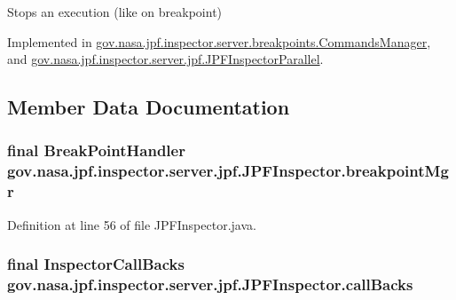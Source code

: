 Stops an execution (like on breakpoint) 



Implemented in \hyperlink{classgov_1_1nasa_1_1jpf_1_1inspector_1_1server_1_1breakpoints_1_1_commands_manager_ad3de2e0a6d30af40d0167bb7ec11f305}{gov.\+nasa.\+jpf.\+inspector.\+server.\+breakpoints.\+Commands\+Manager}, and \hyperlink{classgov_1_1nasa_1_1jpf_1_1inspector_1_1server_1_1jpf_1_1_j_p_f_inspector_parallel_a463604600d1f706e87ace1aeb2c4ef39}{gov.\+nasa.\+jpf.\+inspector.\+server.\+jpf.\+J\+P\+F\+Inspector\+Parallel}.



\subsection{Member Data Documentation}
\subsubsection[{\texorpdfstring{breakpoint\+Mgr}{breakpointMgr}}]{\setlength{\rightskip}{0pt plus 5cm}final {\bf Break\+Point\+Handler} gov.\+nasa.\+jpf.\+inspector.\+server.\+jpf.\+J\+P\+F\+Inspector.\+breakpoint\+Mgr\hspace{0.3cm}{\ttfamily [protected]}}\hypertarget{classgov_1_1nasa_1_1jpf_1_1inspector_1_1server_1_1jpf_1_1_j_p_f_inspector_a09d91c4c802c9c9822285507712015d2}{}\label{classgov_1_1nasa_1_1jpf_1_1inspector_1_1server_1_1jpf_1_1_j_p_f_inspector_a09d91c4c802c9c9822285507712015d2}


Definition at line 56 of file J\+P\+F\+Inspector.\+java.

\subsubsection[{\texorpdfstring{call\+Backs}{callBacks}}]{\setlength{\rightskip}{0pt plus 5cm}final {\bf Inspector\+Call\+Backs} gov.\+nasa.\+jpf.\+inspector.\+server.\+jpf.\+J\+P\+F\+Inspector.\+call\+Backs\hspace{0.3cm}{\ttfamily [protected]}}\hypertarget{classgov_1_1nasa_1_1jpf_1_1inspector_1_1server_1_1jpf_1_1_j_p_f_inspector_a64c8af9d5f44108e09eee97c3dd16484}{}\label{classgov_1_1nasa_1_1jpf_1_1inspector_1_1server_1_1jpf_1_1_j_p_f_inspector_a64c8af9d5f44108e09eee97c3dd16484}


